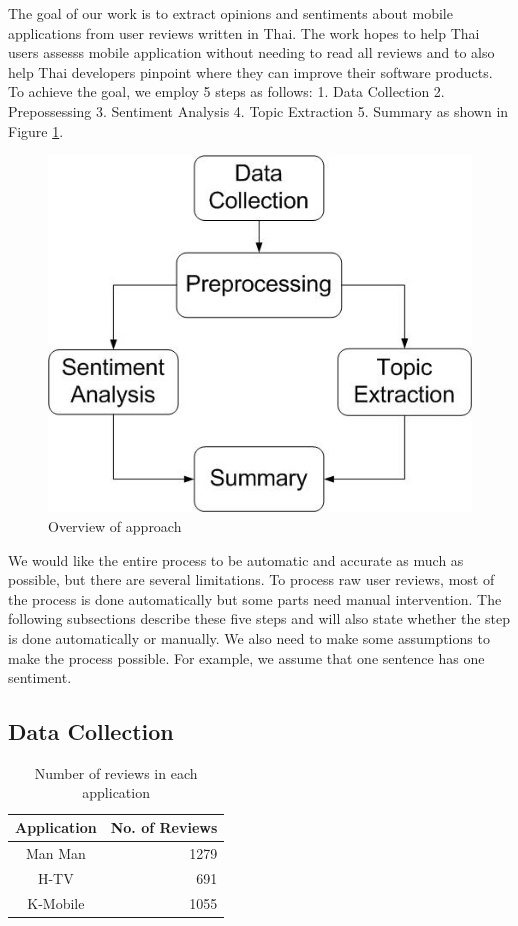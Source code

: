 
The goal of our work is to extract opinions and sentiments about mobile applications from user reviews written in Thai. The work hopes to help Thai users assesss mobile application without needing to read all reviews and to also help Thai developers pinpoint where they can improve their software products. To achieve the goal, we employ 5 steps as follows: 1. Data Collection 2. Prepossessing 3. Sentiment Analysis 4. Topic Extraction 5. Summary as shown in Figure \ref{fig:approachFig}. 

\begin{figure}[h]
	\centering
	\includegraphics[width=.5\linewidth]{Process.jpg}
	\caption{Overview of approach}
	\label{fig:approachFig}
\end{figure}

We would like the entire process to be automatic and accurate as much as possible, but there are several limitations. To process raw user reviews, most of the process is done automatically but some parts need manual intervention. The following subsections describe these five steps and will also state whether the step is done automatically or manually. We also need to make some assumptions to make the process possible. For example, we assume that one sentence has one sentiment.

\subsection{Data Collection}

\begin{table}[h]
	\caption{Number of reviews in each application}
	\label{table:NoOfReview}
	\centering
	\begin{tabular}{|c|r|}
		\hline
		\textbf{Application} & \multicolumn{1}{|c|}{\textbf{No. of Reviews}} \\
		\hline
		Man Man & 1279\\
		\hline
		H-TV & 691\\
		\hline
		K-Mobile & 1055\\
		\hline
	\end{tabular}
\end{table}

